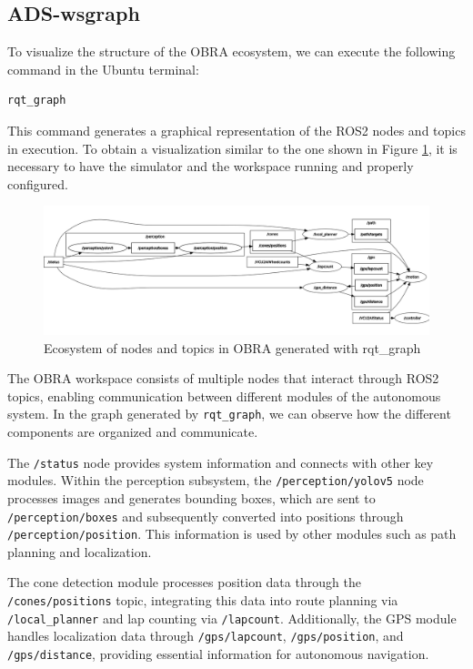 \documentclass[a4paper,11pt]{report}
\begin{document}
\subsection{ADS-wsgraph}
To visualize the structure of the OBRA ecosystem, we can execute the following command in the Ubuntu terminal:

\begin{verbatim}
rqt_graph
\end{verbatim}

This command generates a graphical representation of the ROS2 nodes and topics in execution. To obtain a visualization similar to the one shown in Figure \ref{fig:obra_graph}, it is necessary to have the simulator and the workspace running and properly configured.

\begin{figure}[h]
    \centering
    \includegraphics[width=\textwidth]{Images/wsgraph.png}
    \caption{Ecosystem of nodes and topics in OBRA generated with rqt\_graph}
    \label{fig:obra_graph}
\end{figure}

The OBRA workspace consists of multiple nodes that interact through ROS2 topics, enabling communication between different modules of the autonomous system. In the graph generated by \texttt{rqt\_graph}, we can observe how the different components are organized and communicate.

The \texttt{/status} node provides system information and connects with other key modules. Within the perception subsystem, the \texttt{/perception/yolov5} node processes images and generates bounding boxes, which are sent to \texttt{/perception/boxes} and subsequently converted into positions through \texttt{/perception/position}. This information is used by other modules such as path planning and localization.

The cone detection module processes position data through the \texttt{/cones/positions} topic, integrating this data into route planning via \texttt{/local\_planner} and lap counting via \texttt{/lapcount}. Additionally, the GPS module handles localization data through \texttt{/gps/lapcount}, \texttt{/gps/position}, and \texttt{/gps/distance}, providing essential information for autonomous navigation.
\end{document}
